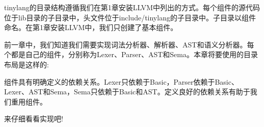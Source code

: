 tinylang的目录结构遵循我们在第1章安装LLVM中列出的方式。每个组件的源代码位于lib目录的子目录中，头文件位于include/tinylang的子目录中。子目录以组件命名。在第1章安装LLVM中，我们只创建了基本组件。

前一章中，我们知道我们需要实现词法分析器、解析器、AST和语义分析器。每个都是自己的组件，分别称为Lexer、Parser、AST和Sema。本章将要使用的目录布局是这样的:


组件具有明确定义的依赖关系。Lexer只依赖于Basic，Parser依赖于Basic、Lexer、AST和Sema，Sema只依赖于Basic和AST。定义良好的依赖关系有助于我们重用组件。

来仔细看看实现吧!
